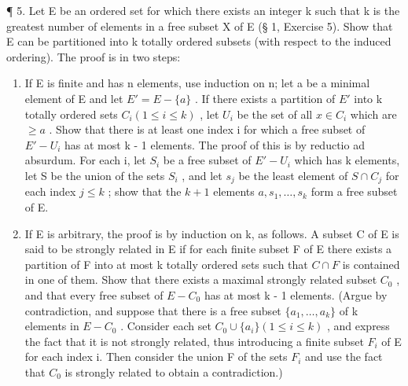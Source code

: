 ¶ 5. Let E be an ordered set for which there exists an integer k such that k is the greatest number of elements in a free subset X of E (§ 1, Exercise 5). Show that E can be partitioned into k totally ordered subsets (with respect to the induced ordering). The proof is in two steps:

\begin{enumerate}
\def\labelenumi{(\alph{enumi})}
\item
  If E is finite and has n elements, use induction on n; let a be a minimal element of E and let \(E' = E - \{a\}\) . If there exists a partition of \(E'\) into k totally ordered sets \(C_i (1 \leqslant i \leqslant k)\) , let \(U_i\) be the set of all \(x \in C_i\) which are \(\geqslant a\) . Show that there is at least one index i for which a free subset of \(E' - U_i\) has at most k - 1 elements. The proof of this is by reductio ad absurdum. For each i, let \(S_i\) be a free subset of \(E' - U_i\) which has k elements, let S be the union of the sets \(S_i\) , and let \(s_j\) be the least element of \(S \cap C_j\) for each index \(j \leqslant k\) ; show that the \(k + 1\) elements \(a, s_1, \ldots, s_k\) form a free subset of E.
\item
  If E is arbitrary, the proof is by induction on k, as follows. A subset C of E is said to be strongly related in E if for each finite subset F of E there exists a partition of F into at most k totally ordered sets such that \(C \cap F\) is contained in one of them. Show that there exists a maximal strongly related subset \(C_{0}\) , and that every free subset of \(E - C_{0}\) has at most k - 1 elements. (Argue by contradiction, and suppose that there is a free subset \(\{a_{1}, \ldots, a_{k}\}\) of k elements in \(E - C_{0}\) . Consider each set \(C_{0} \cup \{a_{i}\} (1 \leqslant i \leqslant k)\) , and express the fact that it is not strongly related, thus introducing a finite subset \(F_{i}\) of E for each index i. Then consider the union F of the sets \(F_{i}\) and use the fact that \(C_{0}\) is strongly related to obtain a contradiction.)
\end{enumerate}

